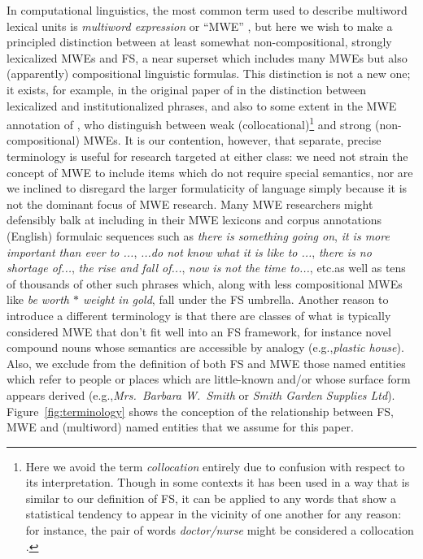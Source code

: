 \documentclass[11pt,letterpaper]{article}
\makeatletter
\def \eg {e.g.,\@ }
\def \etc {etc.\@ }
\newcommand{\dotts}{...}
\newcommand{\gap}{$*$\xspace}
\newcommand{\ex}[1]{\textit{#1}\xspace}
\newcommand{\figref}[2][]{Figure#1~\ref{#2}\xspace}
\makeatother
\begin{document}
In computational linguistics, the most common term used to describe multiword lexical units is \emph{multiword expression} or ``MWE'' \cite{Sag02,Baldwin10}, but here we wish to make a principled distinction between at least somewhat non-compositional, strongly lexicalized MWEs and FS, a near superset which includes many MWEs but also (apparently) compositional linguistic formulas. This distinction is not a new one; it exists, for example, in the original paper of  in the distinction between lexicalized and institutionalized phrases, and also to some extent in the MWE annotation of , who distinguish between weak (collocational)\footnote{Here we avoid the term \emph{collocation} entirely due to confusion with respect to its interpretation. Though in some contexts it has been used in a way that is similar to our definition of FS, it can be applied to any words that show a statistical tendency to appear in the vicinity of one another for any reason: for instance, the pair of words \ex{doctor/nurse} might be considered a collocation \cite{Ramisch14}.}  and strong (non-compositional) MWEs. It is our contention, however, that separate, precise terminology is useful for research targeted at either class: we need not strain the concept of MWE to include items which do not require special semantics, nor are we inclined to disregard the larger formulaticity of language simply because it is not the dominant focus of MWE research. Many MWE researchers might defensibly balk at including in their MWE lexicons and corpus annotations (English) formulaic sequences such as \ex{there is something going on}, \ex{it is more important than ever to \dotts}, \ex{\dotts do not know what it is like to \dotts}, \ex{there is no shortage of\dotts}, \ex{the rise and fall of\dotts}, \ex{now is not the time to\dotts}, \etc as well as tens of thousands of other such phrases which, along with less compositional MWEs like \ex{be worth \gap weight in gold}, fall under the FS umbrella. Another reason to introduce a different terminology is that there are classes of what is typically considered MWE that don't fit well into an FS framework, for instance novel compound nouns whose semantics are accessible by analogy (\eg \ex{plastic house}). Also, we exclude from the definition of both FS and MWE those named entities which refer to people or places which are little-known and/or whose surface form appears derived (\eg \ex{Mrs.\ Barbara W.\ Smith} or \ex{Smith Garden Supplies Ltd}). \figref{fig:terminology} shows the conception of the relationship between FS, MWE and (multiword) named entities that we assume for this paper.
\end{document}
